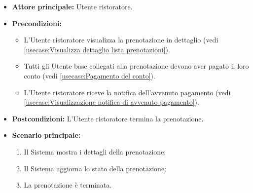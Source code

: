 \label{usecase:Termina prenotazione}
\begin{itemize}
	\item \textbf{Attore principale:} Utente ristoratore.

	\item \textbf{Precondizioni:} 
    \begin{itemize}
        \item L'Utente ristoratore visualizza la prenotazione in dettaglio (vedi \autoref{usecase:Visualizza dettaglio lista prenotazioni}).
        \item Tutti gli Utente base collegati alla prenotazione devono aver pagato il loro conto (vedi \autoref{usecase:Pagamento del conto}).
        \item L'Utente ristoratore riceve la notifica dell'avvenuto pagamento (vedi \autoref{usecase:Visualizzazione notifica di avvenuto pagamento}).
    \end{itemize}

	\item \textbf{Postcondizioni:} L'Utente ristoratore termina la prenotazione.


	\item \textbf{Scenario principale:}
	      \begin{enumerate}
		      \item Il Sistema mostra i dettagli della prenotazione;
		      \item Il Sistema aggiorna lo stato della prenotazione;
		      \item La prenotazione è terminata.
	      \end{enumerate}
\end{itemize}
